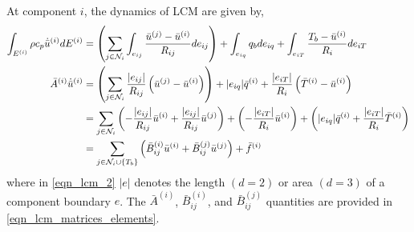 At component $i$, the dynamics of LCM are given by,
\begin{subequations}
    \begin{align}
        \int_{E^{(i)}}\rho c_p \dot{\bar{u}}^{(i)} dE^{(i)} &= \left(\sum_{j\in\mathcal{N}_i}\int_{e_{ij}}\frac{\bar{u}^{(j)} - \bar{u}^{(i)}}{R_{ij}}de_{ij}\right) + \int_{e_{iq}} q_b de_{iq} + \int_{e_{iT}}\frac{T_b - \bar{u}^{(i)}}{R_i}de_{iT}\label{eqn_lcm_1}\\
        \bar{A}^{(i)}\dot{\bar{u}}^{(i)} &= \left(\sum_{j\in\mathcal{N}_i}\frac{|e_{ij}|}{R_{ij}}\left(\bar{u}^{(j)} - \bar{u}^{(i)}\right)\right) + |e_{iq}|\bar{q}^{(i)} + \frac{|e_{iT}|}{R_i}\left(\bar{T}^{(i)} - \bar{u}^{(i)}\right) \label{eqn_lcm_2}\\ 
        &= \sum_{j\in\mathcal{N}_i}\left(-\frac{|e_{ij}|}{R_{ij}}\bar{u}^{(i)} + \frac{|e_{ij}|}{R_{ij}}\bar{u}^{(j)}\right) + \left(-\frac{|e_{iT}|}{R_{i}}\bar{u}^{(i)}\right) + \left(|e_{iq}|\bar{q}^{(i)} + \frac{|e_{iT}|}{R_i}\bar{T}^{(i)}\right)\label{eqn_lcm_3}\\
        &= \sum_{j\in\mathcal{N}_i\cup\left\{T_b\right\}}\left(\bar{B}^{(i)}_{ij}\bar{u}^{(i)} + \bar{B}^{(j)}_{ij}\bar{u}^{(j)}\right) + \bar{f}^{(i)}\label{eqn_lcm_4}
    \end{align}
\end{subequations}
where in \cref{eqn_lcm_2} $|e|$ denotes the length $(d=2)$ or area $(d=3)$ of a component boundary $e$. The $\bar{A}^{(i)}$, $\bar{B}_{ij}^{(i)}$, and $\bar{B}_{ij}^{(j)}$ quantities are provided in \cref{eqn_lcm_matrices_elements}.

